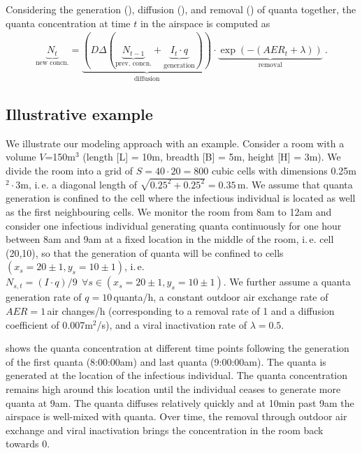 \documentclass[fleqn,11pt]{wlscirep_supp}
\newcommand\ie{i.\,e.\xspace}
\begin{document}
Considering the generation (), diffusion (), and removal () of quanta together, the quanta concentration at time $t$ in the airspace is computed as
\begin{align}\label{eq:spattemp-N}
    \underbrace{N_{t}}_{\text{new concn.}} = \underbrace{\left(D \Delta (\underbrace{N_{t-1}}_{\text{prev. concn.}} + \underbrace{I_t \cdot q}_{\text{generation}})\right)}_{\text{diffusion}} \cdot \underbrace{\exp\left(-(AER_t + \lambda)\right)}_{\text{removal}} ~.
\end{align}

\subsection{Illustrative example}\label{sec:example}

We illustrate our modeling approach with an example. Consider a room with a volume $V$=150m$^3$ (length [L] = 10m, breadth [B] = 5m, height [H] = 3m). We divide the room into a grid of $S = 40 \cdot 20 = 800$ cubic cells with dimensions 0.25m$^2 \cdot 3$m, \ie a diagonal length of $\sqrt{0.25^2 + 0.25^2} = 0.35$\,m. We assume that quanta generation is confined to the cell where the infectious individual is located as well as the first neighbouring cells. We monitor the room from 8am to 12am and consider one infectious individual generating quanta continuously for one hour between 8am and 9am at a fixed location in the middle of the room, \ie cell (20,10), so that the generation of quanta will be confined to cells $(x_s = 20\pm1, y_s = 10\pm1)$, \ie $N_{s,t} = (I \cdot q) / 9 ~~ \forall s \in (x_s = 20\pm1, y_s = 10\pm1)$. We further assume a quanta generation rate of $q = 10$\,quanta/h, a constant outdoor air exchange rate of $AER = 1$\,air changes/h (corresponding to a removal rate of 1 and a diffusion coefficient of 0.007m$^2$/s), and a viral inactivation rate of $\lambda = 0.5$. 

 shows the quanta concentration at different time points following the generation of the first quanta (8:00:00am) and last quanta (9:00:00am). The quanta is generated at the location of the infectious individual. The quanta concentration remains high around this location until the individual ceases to generate more quanta at 9am. The quanta diffuses relatively quickly and at 10min past 9am the airspace is well-mixed with quanta. Over time, the removal through outdoor air exchange and viral inactivation brings the concentration in the room back towards 0. 
\end{document}
